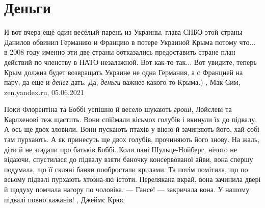  
 
 
 
 
\chapter{Деньги}
\label{sec:slova.dengi}

И вот вчера ещё один весёлый парень из Украины, глава СНБО этой страны Данилов
обвинил Германию и Францию в потере Украиной Крыма потому что... в 2008 году
именно эти две страны оотказались предоставить стране план действий по членству
в НАТО незалэжной.  Вот как-то так... Вот увидите, теперь Крым должна будет
возвращать Украине не одна Германия, а с Францией на пару, да еще и \emph{денег} дать.
Да, \emph{деньги} важнее какого-то Крыма.)
, 
Мак Сим, zen.yandex.ru, 05.06.2021

Поки Флорентіна та Боббі успішно й весело шукають \emph{гроші}, Лойслеві та
Карлхенові теж щастить. Вони спіймали вісьмох голубів і вкинули їх до підвалу.
А ось ще двох зловили.  Вони пускають птахів у вікно й зачиняють його, хай собі
там пурхають. А як принесуть ще двох голубів, прочиняють його знову.  На жаль,
діти й не згадали про батьків Боббі. Коли пані Шульце-Нойберг, нічого не
відаючи, спустилася до підвалу взяти баночку консервованої айви, вона спершу
подумала, що її скляні банки пообростали крилами. Та потім помітила, що по
всьому підвалі пурхають хтозна-які істоти. Перелякана вкрай, вона зачинила
двері й щодуху помчала нагору по чоловіка.  — Гансе! — закричала вона. У нашому
підвалі повно кажанів!
, Джеймс Крюс
